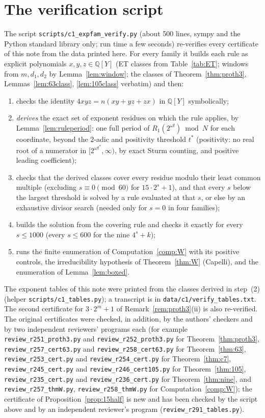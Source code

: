 \documentclass[11pt,reqno]{amsart}
\theoremstyle{definition}
\newcommand{\Q}{\mathbb Q}
\begin{document}
\section{The verification script}\label{app:script}
\sloppy
The script \texttt{scripts/c1\_expfam\_verify.py} (about 500 lines, sympy and
the Python standard library only; run time a few seconds) re-verifies every
certificate of this note from the data printed here.  For every family it
builds each rule as explicit polynomials $x,y,z\in\Q[Y]$ (ET classes from
Table~\ref{tab:ET}; windows from $m,d_1,d_2$ by Lemma~\ref{lem:window}; the
classes of Theorem~\ref{thm:proth3}, Lemmas~\ref{lem:63class},
\ref{lem:105class} verbatim) and then:
\begin{enumerate}
\item checks the identity $4xyz=n(xy+yz+zx)$ in $\Q[Y]$ symbolically;
\item \emph{derives} the exact set of exponent residues on which the rule
applies, by Lemma~\ref{lem:ruleperiod}: one full period of
$R_1(2^{\omega t})\bmod N$ for each coordinate, beyond the $2$-adic and
positivity threshold $t^*$ (positivity: no real root of a numerator in
$[2^{\omega t^*},\infty)$, by exact Sturm counting, and positive leading
coefficient);
\item checks that the derived classes cover every residue modulo their
least common multiple (excluding $s\equiv0\pmod{60}$ for $15\cdot2^s+1$), and
that every $s$ below the largest threshold is solved by a rule evaluated at
that $s$, or else by an exhaustive divisor search (needed only for
$s=0$ in four families);
\item builds the solution from the covering rule and checks it exactly for
every $s\le1000$ (every $s\le600$ for the nine $4^s+k$);
\item runs the finite enumeration of Computation~\ref{comp:W} with its
positive controls, the irreducibility hypothesis of Theorem~\ref{thm:W}
(Capelli), and the enumeration of Lemma~\ref{lem:boxed}.
\end{enumerate}
The exponent tables of this note were printed from the classes derived in
step~(2) (helper \texttt{scripts/c1\_tables.py}); a transcript is in
\texttt{data/c1/verify\_tables.txt}.  The second certificate for
$3\cdot2^m+1$ of Remark~\ref{rem:proth3}(ii) is also re-verified.  The
original certificates were checked, in addition, by the authors' checkers
and by two independent reviewers' programs each (for example
\texttt{review\_r251\_proth3.py} and \texttt{review\_r252\_proth3.py} for
Theorem~\ref{thm:proth3}, \texttt{review\_r257\_cert63.py} and
\texttt{review\_r258\_cert63.py} for Theorem~\ref{thm:63},
\texttt{review\_r253\_cert.py} and \texttt{review\_r254\_cert.py} for
Theorem~\ref{thm:c7}, \texttt{review\_r245\_cert.py} and
\texttt{review\_r246\_cert105.py} for Theorem~\ref{thm:105},
\texttt{review\_r235\_cert.py} and \texttt{review\_r236\_cert.py} for
Theorem~\ref{thm:nine}, and \texttt{review\_r257\_thmW.py},
\texttt{review\_r258\_thmW.py} for Computation~\ref{comp:W}); the
certificate of Proposition~\ref{prop:15half} is new and has been checked by
the script above and by an independent reviewer's program
(\texttt{review\_r291\_tables.py}).%
\end{document}
